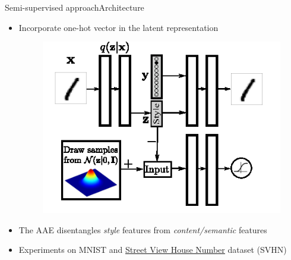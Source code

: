 \documentclass[10pt]{beamer}
\begin{document}
\begin{frame}{Semi-supervised approach}{Architecture}
\begin{itemize}
  \item Incorporate one-hot vector in the latent representation
  \begin{figure}
    \centering
    \includegraphics[width=0.6\linewidth]{../images/aae-architecture-02.png}
  \end{figure}
  \item The AAE disentangles \textit{style} features from \textit{content/semantic} features
  \item Experiments on MNIST and \href{../images/svhn.gif}{\underline{Street View House Number}} dataset (SVHN)
\end{itemize}
\end{frame}
\end{document}
